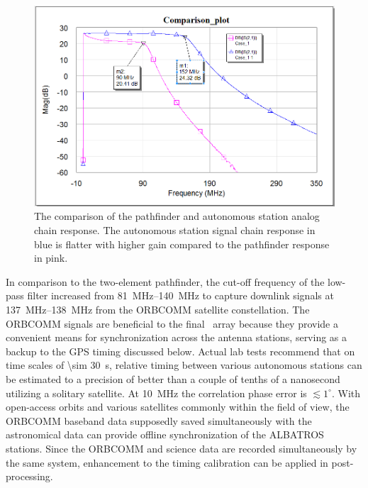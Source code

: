 \begin{figure}
	\centering
	\includegraphics[width=0.7\linewidth]{Figures/comparison}
	\caption{The comparison of the pathfinder and autonomous station analog chain response. The autonomous station signal chain response in blue is flatter with higher gain compared to the pathfinder response in pink.}
	\label{Fig:comparison}
\end{figure}

In comparison to the two-element pathfinder, the cut-off frequency of the low-pass filter increased from \SIrange{81}{140}{\mega\hertz} to capture downlink signals at \SIrange{137}{138}{\mega\hertz} from the ORBCOMM satellite constellation. The ORBCOMM signals are beneficial to the final \albatros\ array because they provide a convenient means for synchronization across the antenna stations, serving as a backup to the GPS timing discussed below. Actual lab tests recommend that on time scales of \SI{\sim 30}{\second}, relative timing between various autonomous stations can be estimated to a precision of better than a couple of tenths of a nanosecond utilizing a solitary satellite. At \SI{10}{\mega\hertz} the correlation phase error is $\lesssim1^\circ$. With open-access orbits and various satellites commonly within the field of view, the ORBCOMM baseband data supposedly saved simultaneously with the astronomical data can provide offline synchronization of the ALBATROS stations. Since the ORBCOMM and science data are recorded simultaneously by the same system, enhancement to the timing calibration can be applied in post-processing.

